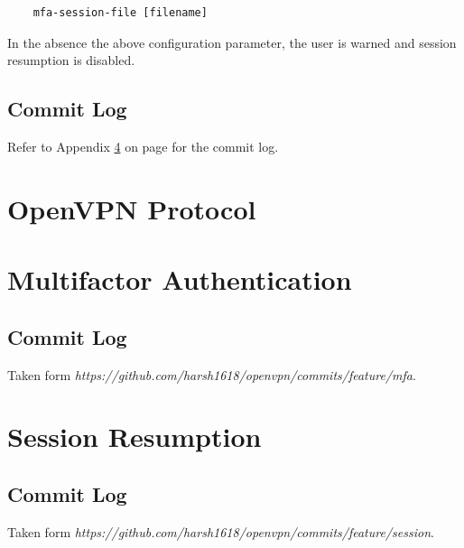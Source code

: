 \documentclass[11pt,oneside]{book}
\begin{document}
\begin{verbatim}
    mfa-session-file [filename]
\end{verbatim}

\noindent
In the absence the above configuration parameter, the user is warned and session resumption is
disabled.

\section{Commit Log}
Refer to Appendix \ref{Session:Commit} on page \pageref{Session:Commit} for the commit log.

\appendix
\chapter{OpenVPN Protocol}
\cite{OpenVPN_Security}
\label{OpenVPN:Protocol}


\chapter{Multifactor Authentication}
\label{MFA:Commit}
\section{Commit Log}
Taken form \emph{https://github.com/harsh1618/openvpn/commits/feature/mfa}.\\


\chapter{Session Resumption}
\label{Session:Commit}
\section{Commit Log}
Taken form \emph{https://github.com/harsh1618/openvpn/commits/feature/session}.\\





\printindex
{}
\end{document}
